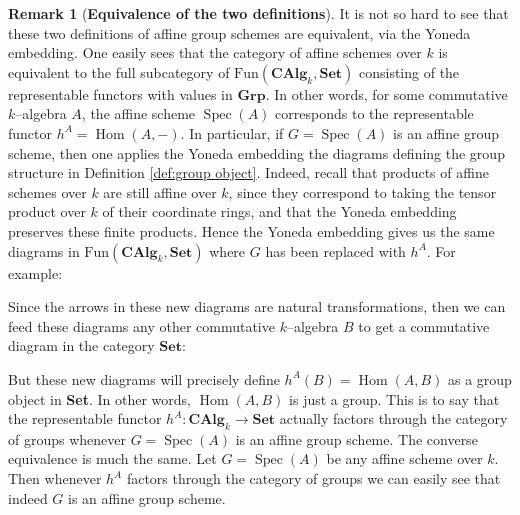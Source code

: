 \documentclass{article}
\theoremstyle{plain}
\theoremstyle{definition}
\newtheorem{Rem}[Th]{Remark}
\DeclareMathOperator{\Hom}{Hom}
\DeclareMathOperator{\Spec}{Spec}
\begin{document}
\begin{Rem}[\textbf{Equivalence of the two definitions}]\label{equivalence of definitions} It is not so hard to see that these two definitions of affine group schemes are equivalent, via the Yoneda embedding. One easily sees that the category of affine schemes over $k$ is equivalent to the full subcategory of $\text{Fun}(\textbf{CAlg}_k, \textbf{Set})$ consisting of the representable functors with values in $\mathbf{Grp}$. In other words, for some commutative $k$--algebra $A$, the affine scheme $\Spec(A)$ corresponds to the representable functor $h^A=\Hom(A, -)$. In particular, if $G=\Spec(A)$ is an affine group scheme, then one applies the Yoneda embedding the diagrams defining the group structure in Definition \ref{def:group object}. Indeed, recall that products of affine schemes over $k$ are still affine over $k$, since they correspond to taking the tensor product over $k$ of their coordinate rings, and that the Yoneda embedding preserves these finite products. Hence the Yoneda embedding gives us the same diagrams in $\text{Fun}(\textbf{CAlg}_k, \textbf{Set})$ where $G$ has been replaced with $h^A$. For example:
\begin{center}
\end{center}
Since the arrows in these new diagrams are natural transformations, then we can feed these diagrams any other commutative $k$--algebra $B$ to get a commutative diagram in the category $\textbf{Set}$:
\begin{center}
\end{center}
But these new diagrams will precisely define $h^A(B)=\Hom(A, B)$ as a group object in \textbf{Set}. In other words, $\Hom(A, B)$ is just a group. This is to say that the representable functor $h^A\colon \textbf{CAlg}_k\to \textbf{Set}$ actually factors through the category of groups whenever $G=\Spec(A)$ is an affine group scheme. The converse equivalence is much the same. Let $G=\Spec(A)$ be any affine scheme over $k$. Then whenever $h^A$ factors through the category of groups we can easily see that indeed $G$ is an affine group scheme.
\end{Rem}
\end{document}
